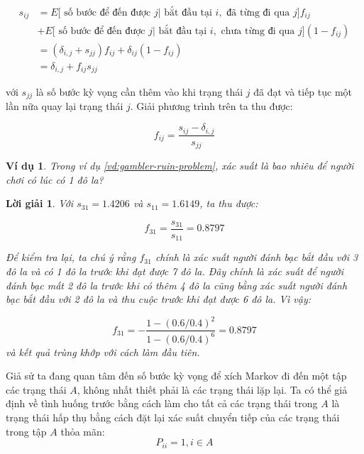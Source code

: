 \documentclass[14pt, a4paper]{article}
\numberwithin{equation}{section}
\numberwithin{figure}{section}
\theoremstyle{sltheorem}
\newtheorem{vd}{Ví dụ}
\theoremstyle{soltheorem}
\newtheorem*{loigiai}{Lời giải}
\numberwithin{dl}{section}
\numberwithin{md}{section}
\numberwithin{vd}{section}
\begin{document}
    \begin{equation*}
        \begin{aligned}
            s_{ij} &= E \lbrack \text{ số bước để đến được } j \vert \text{ bắt đầu tại } i, \text{ đã từng đi qua } j \rbrack f_{ij} \\ & + E \lbrack \text{ số bước để đến được } j \vert \text{ bắt đầu tại } i, \text{ chưa từng đi qua } j \rbrack (1 - f_{ij}) \\
            &= (\delta_{i, j} + s_{{jj}}) f_{ij} + \delta_{ij}(1 - f_{ij}) \\
            &= \delta_{i,j} + f_{ij} s_{jj}
        \end{aligned}
    \end{equation*}

    với $s_{jj}$ là số bước kỳ vọng cần thêm vào khi trạng thái $j$ đã đạt và tiếp tục một lần nữa quay lại trạng thái $j$.
    Giải phương trình trên ta thu được:

    \begin{equation*}
        f_{ij} = \dfrac{s_{ij} - \delta_{i,j}}{s_{jj}}
    \end{equation*}

    \begin{vd}
        Trong ví dụ \ref{vd:gambler-ruin-problem}, xác suất là bao nhiêu để người chơi có lúc có 1 đô la?
    \end{vd}

    \begin{loigiai}
        Với $s_{31}=1.4206$ và $s_{11}=1.6149$, ta thu được:
        
        \begin{equation*}
            f_{31} = \dfrac{s_{31}}{s_{11}}=0.8797
        \end{equation*}

        Để kiểm tra lại, ta chú ý rằng $f_{31}$ chính là xác suất người đánh bạc bắt đầu với 3 đô la và có 1 đô la trước khi đạt được 7 đô la.
        Đây chính là xác suất để người đánh bạc mất 2 đô la trước khi có thêm 4 đô la cũng bằng xác suất người đánh bạc bắt đầu với 2 đô la và thu cuộc trước khi đạt được 6 đô la.
        Vì vậy:

        \begin{equation*}
            f_{31} = - \dfrac{1 - (0.6/0.4)^2}{1-(0.6/0.4)^6}=0.8797
        \end{equation*}
        và kết quả trùng khớp với cách làm đầu tiên.
    \end{loigiai}

    Giả sử ta đang quan tâm đến số bước kỳ vọng để xích Markov đi đến một tập các trạng thái $A$, không nhất thiết phải là các trạng thái lặp lại.
    Ta có thể giả định về tình huống trước bằng cách làm cho tất cả các trạng thái trong $A$ là trạng thái hấp thụ bằng cách đặt lại xác suất chuyển tiếp của các trạng thái trong tập $A$ thỏa mãn:
    \begin{equation*}
        P_{ii} = 1, i \in A
    \end{equation*}
\end{document}
